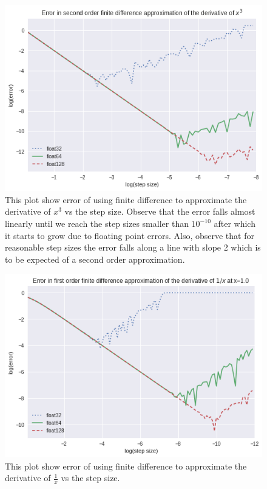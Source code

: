 \begin{figure}[hbt!]
    \centering
    \includegraphics[width=\textwidth]{images/x^3_error_order2.png}
    \caption{This plot show error of using finite difference to approximate the derivative of $x^3$ vs the step size. Observe that the error falls almost linearly until we reach the step sizes smaller than $10^{-10}$ after which it starts to grow due to floating point errors. Also, observe that for reasonable step sizes the error falls along a line with slope 2 which is to be expected of a second order approximation. }\label{fig:x^3_error_order2}
\end{figure}

\begin{figure}[hbt!]
    \centering
    \includegraphics[width=\textwidth]{images/1_x_error_at_1.png}
    \caption{This plot show error of using finite difference to approximate the derivative of $\frac{1}{x}$ vs the step size.}\label{fig:1/x_1}
\end{figure}

